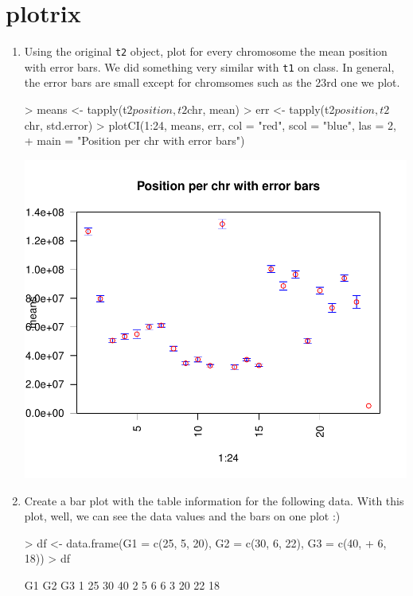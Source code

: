 \documentclass[letterpaper,12pt]{article}
\newcommand{\pl}[1]{\texttt{#1}}
\begin{document}
\section{plotrix}
  \begin{enumerate}
  \item Using the original \pl{t2} object, plot for every chromosome the mean position with error bars. We did something very similar with \pl{t1} on class. In general, the error bars are small except for chromsomes such as the 23rd one we plot.
\begin{Schunk}
\begin{Sinput}
> means <- tapply(t2$position, t2$chr, mean)
> err <- tapply(t2$position, t2$chr, std.error)
> plotCI(1:24, means, err, col = "red", scol = "blue", las = 2, 
+     main = "Position per chr with error bars")
\end{Sinput}
\end{Schunk}
\includegraphics{plots/fig-005}
  \item Create a bar plot with the table information for the following data. With this plot, well, we can see the data values and the bars on one plot :)
\begin{Schunk}
\begin{Sinput}
> df <- data.frame(G1 = c(25, 5, 20), G2 = c(30, 6, 22), G3 = c(40, 
+     6, 18))
> df
\end{Sinput}
\begin{Soutput}
  G1 G2 G3
1 25 30 40
2  5  6  6
3 20 22 18
\end{Soutput}

\end{Schunk}
\end{enumerate}
\end{document}
